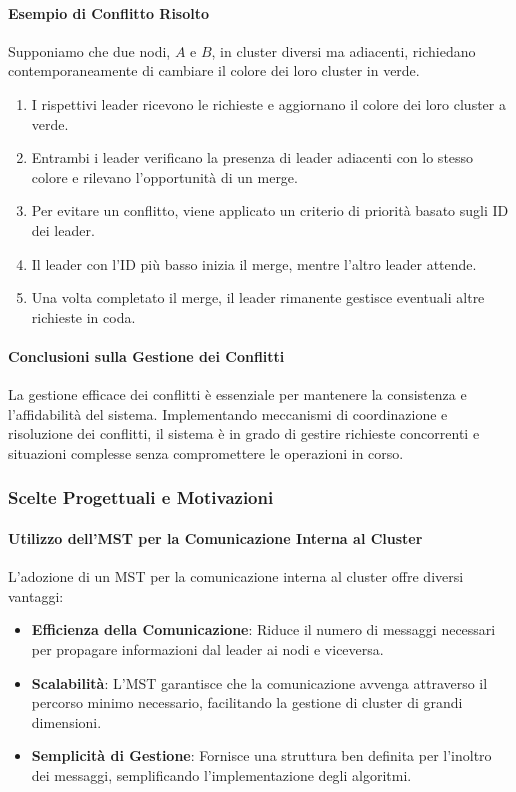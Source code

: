 \documentclass[12pt, a4paper]{report}
\begin{document}
\paragraph{Esempio di Conflitto Risolto}

Supponiamo che due nodi, $A$ e $B$, in cluster diversi ma adiacenti, richiedano contemporaneamente di cambiare il colore dei loro cluster in verde.

\begin{enumerate}
    \item I rispettivi leader ricevono le richieste e aggiornano il colore dei loro cluster a verde.
    \item Entrambi i leader verificano la presenza di leader adiacenti con lo stesso colore e rilevano l'opportunità di un merge.
    \item Per evitare un conflitto, viene applicato un criterio di priorità basato sugli ID dei leader.
    \item Il leader con l'ID più basso inizia il merge, mentre l'altro leader attende.
    \item Una volta completato il merge, il leader rimanente gestisce eventuali altre richieste in coda.
\end{enumerate}

\paragraph{Conclusioni sulla Gestione dei Conflitti}

La gestione efficace dei conflitti è essenziale per mantenere la consistenza e l'affidabilità del sistema. Implementando meccanismi di coordinazione e risoluzione dei conflitti, il sistema è in grado di gestire richieste concorrenti e situazioni complesse senza compromettere le operazioni in corso.



\subsubsection{Scelte Progettuali e Motivazioni}

\paragraph{Utilizzo dell'MST per la Comunicazione Interna al Cluster}

L'adozione di un MST per la comunicazione interna al cluster offre diversi vantaggi:

\begin{itemize}
    \item \textbf{Efficienza della Comunicazione}: Riduce il numero di messaggi necessari per propagare informazioni dal leader ai nodi e viceversa.
    \item \textbf{Scalabilità}: L'MST garantisce che la comunicazione avvenga attraverso il percorso minimo necessario, facilitando la gestione di cluster di grandi dimensioni.
    \item \textbf{Semplicità di Gestione}: Fornisce una struttura ben definita per l'inoltro dei messaggi, semplificando l'implementazione degli algoritmi.
\end{itemize}
\end{document}
